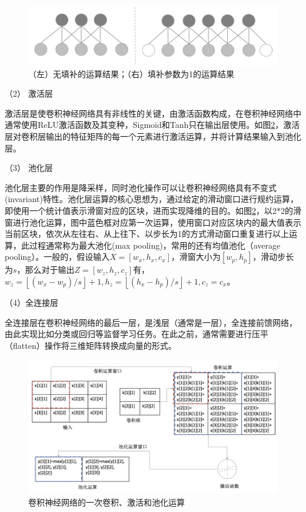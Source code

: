 \begin{figure}[H]
\centering
\includegraphics[scale=0.5]{figures/gan-cnn-padding.png}
\caption{（左）无填补的运算结果；（右）填补参数为1的运算结果}
\label{fig:gan-cnn-padding}
\end{figure}

（2） 激活层

激活层是使卷积神经网络具有非线性的关键，由激活函数构成，在卷积神经网络中通常使用ReLU激活函数及其变种，Sigmoid和Tanh只在输出层使用。如图\ref{fig:gan-cnn-ops}，激活层对卷积层输出的特征矩阵的每一个元素进行激活运算，并将计算结果输入到池化层。

（3） 池化层

池化层主要的作用是降采样，同时池化操作可以让卷积神经网络具有不变式(invariant)特性。池化层运算的核心思想为，通过给定的滑动窗口进行规约运算，即使用一个统计值表示滑窗对应的区块，进而实现降维的目的。如图\ref{fig:gan-cnn-ops}，以2*2的滑窗进行池化运算，图中蓝色框对应第一次运算，使用窗口对应区块内的最大值表示当前区块，依次从左往右、从上往下、以步长为1的方式滑动窗口重复进行以上运算，此过程通常称为最大池化(max pooling)，常用的还有均值池化（average pooling）。一般的，假设输入$X=[w_{x}, h_{x}, c_{x}]$，滑窗大小为$[w_{p}, h_{p}]$，滑动步长为$s$，那么对于输出$Z=[w_{z}, h_{z}, c_{z}]$有，$w_{z} = \left \lfloor (w_{x}-w_{p})/s \right \rfloor+1, h_{z} = \left \lfloor (h_{x}-h_{p})/s \right \rfloor+1, c_{z}=c_{x}$。

（4）全连接层

 全连接层在卷积神经网络的最后一层，是浅层（通常是一层），全连接前馈网络，由此实现比如分类或回归等监督学习任务。在此之前，通常需要进行压平（flatten）操作将三维矩阵转换成向量的形式。

\begin{figure}[H]
\centering
\includegraphics[scale=0.5]{figures/gan-cnn-ops.png}
\caption{卷积神经网络的一次卷积、激活和池化运算}
\label{fig:gan-cnn-ops}
\end{figure}

